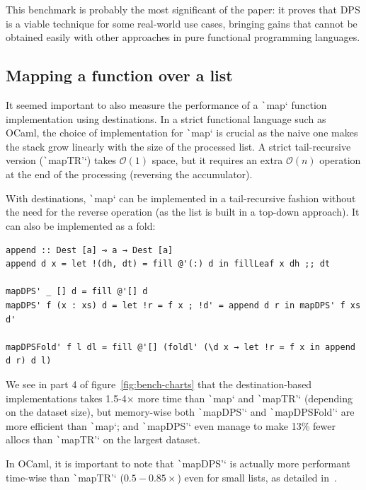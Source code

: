 \documentclass[english]{jflart}
\begin{document}
This benchmark is probably the most significant of the paper: it proves that DPS is a viable technique for some real-world use cases, bringing gains that cannot be obtained easily with other approaches in pure functional programming languages.

\subsection{Mapping a function over a list}\label{ssec:benchmark-map}

It seemed important to also measure the performance of a \texttt`map` function implementation using destinations. In a strict functional language such as OCaml, the choice of implementation for \texttt`map` is crucial as the naive one makes the stack grow linearly with the size of the processed list. A strict tail-recursive version (\texttt`mapTR'`) takes $\mathcal{O}(1)$ space, but it requires an extra $\mathcal{O}(n)$ operation at the end of the processing (reversing the accumulator). 

With destinations, \texttt`map` can be implemented in a tail-recursive fashion without the need for the reverse operation (as the list is built in a top-down approach). It can also be implemented as a fold:
{\small
\begin{verbatim}
append :: Dest [a] ⊸ a → Dest [a]
append d x = let !(dh, dt) = fill @'(:) d in fillLeaf x dh ;; dt

mapDPS' _ [] d = fill @'[] d
mapDPS' f (x : xs) d = let !r = f x ; !d' = append d r in mapDPS' f xs d'

mapDPSFold' f l dl = fill @'[] (foldl' (\d x → let !r = f x in append d r) d l)
\end{verbatim}
}

We see in part 4 of figure~\ref{fig:bench-charts} that the destination-based implementations takes 1.5-4$\times$ more time than \texttt`map` and \texttt`mapTR'` (depending on the dataset size), but memory-wise both \texttt`mapDPS'` and \texttt`mapDPSFold'` are more efficient than \texttt`map`; and \texttt`mapDPS'` even manage to make 13\% fewer allocs than \texttt`mapTR'` on the largest dataset.

In OCaml, it is important to note that \texttt`mapDPS'` is actually more performant time-wise than \texttt`mapTR'` ($0.5-0.85\times$) even for small lists, as detailed in~\cite{bour_tmc_2021}.
\end{document}
